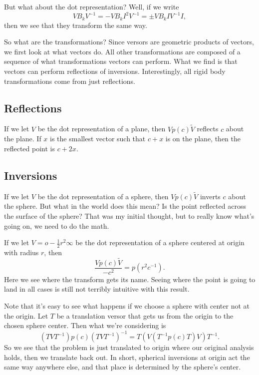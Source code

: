 \documentclass[12pt]{article}
\newcommand{\nvao}{o}
\newcommand{\nvai}{\infty}
\begin{document}
But what about the dot representation?  Well, if we write
\begin{equation*}
VB_kV^{-1} = -VB_kI^2V^{-1} = \pm VB_kIV^{-1}I,
\end{equation*}
then we see that they transform the same way.

So what are the transformations?  Since versors are geometric products of vectors,
we first look at what vectors do.  All other transformations are composed of a sequence
of what transformations vectors can perform.  What we find is that vectors can
perform reflections of inversions.  Interestingly, all rigid body transformations come
from just reflections.

\subsection*{Reflections}

If we let $V$ be the dot representation of a plane, then $Vp(c)\tilde{V}$ reflects $c$ about the plane.
If $x$ is the smallest vector such that $c+x$ is on the plane, then the reflected point is $c + 2x$.

\subsection*{Inversions}

If we let $V$ be the dot representation of a sphere, then $Vp(c)\tilde{V}$ inverts $c$ about the sphere.
But what in the world does this mean?  Is the point reflected across the surface of the sphere?  That was my
initial thought, but to really know what's going on, we need to do the math.

If we let $V=\nvao-\frac{1}{2}r^2\nvai$ be the dot representation of a sphere centered at origin with radius $r$, then
\begin{equation*}
\frac{Vp(c)\tilde{V}}{-c^2} = p(r^2c^{-1}).
\end{equation*}
Here we see where the transform gets its name.  Seeing where the point is going to land in all cases is still
not terribly intuitive with this result.

Note that it's easy to see what happens if we choose a sphere with center not at the origin.
Let $T$ be a translation versor that gets us from the origin to the chosen sphere center.
Then what we're considering is
\begin{equation*}
(TVT^{-1})p(c)(TVT^{-1})^{-1} = T(V(T^{-1}p(c)T)V)T^{-1}.
\end{equation*}
So we see that the problem is just translated to origin where our original analysis holds, then we
translate back out.  In short, spherical inversions at origin act the same way anywhere else, and
that place is determined by the sphere's center.
\end{document}
